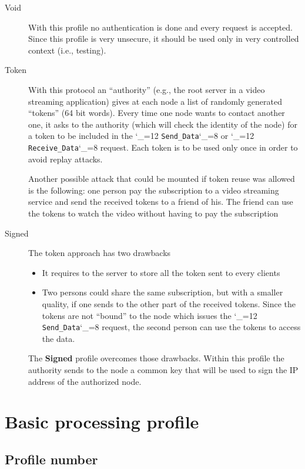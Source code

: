 \documentclass{rfc}
\def\ttt{\catcode`\_=12 \tttii}
\def\tttii#1!{{\tt #1}\catcode`\_=8{}}
\begin{document}
\begin{description}
  \item[Void] With this profile no authentication is done and every
  request is accepted.  Since this profile is very unsecure, it should
  be used only in very controlled context (i.e., testing).
  \item[Token] With this protocol an ``authority'' (e.g., the root
  server in a video streaming application) gives at each node a list
  of randomly generated ``tokens'' (64 bit words).  Every time one
  node wants to contact another one, it asks to the authority (which
  will check the identity of the node) for a token to be included in
  the \ttt Send_Data! or \ttt Receive_Data! request.  Each token is to
  be used only once in order to avoid replay attacks.
\begin{commento}
Another possible attack that could be mounted if token
  reuse was allowed is the following: one person pay the subscription
  to a video streaming service and send the received tokens to a
  friend of his.  The friend can use the tokens to watch the video
  without having to pay the subscription
\end{commento}
  \item[Signed] The token approach has two drawbacks
    \begin{itemize}
      \item
        It requires to the server to store all the token sent to every
        clients 
      \item
        Two persons could share the same subscription, but with a
        smaller quality, if one sends to the other part of the
        received tokens.  Since the tokens are not ``bound'' to the
        node which issues the \ttt Send_Data! request, the second
        person can use the tokens to access the data.
    \end{itemize}
   The \textbf{Signed} profile overcomes those drawbacks.  Within this
   profile the authority sends to the node a common key that will be
   used to sign the IP address of the authorized node.
\end{description}

\chapter{Basic processing profile}
\label{sect:0.0;transport_layer}

\section{Profile number}
\label{sub:0.0.0;transport_layer}
\end{document}
